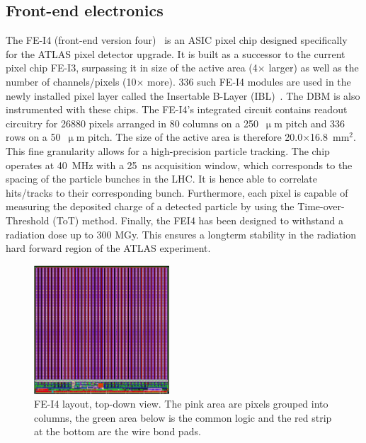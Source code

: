 \documentclass[twoside,12pt]{packages/mytustyle}  %
\begin{document}
\subsection{Front-end electronics}
The FE-I4 (front-end version four)~\cite{} is an ASIC pixel chip designed specifically for the ATLAS pixel detector upgrade. It is built as a successor to the current pixel chip FE-I3, surpassing it in size of the active area (4$\times$ larger) as well as the number of channels/pixels (10$\times$ more). 336 such FE-I4 modules are used in the newly installed pixel layer called the Insertable B-Layer (IBL)~\cite{}. The DBM is also instrumented with these chips. The FE-I4's integrated circuit contains readout circuitry for 26880 pixels arranged in 80 columns on a 250~$\upmu$m pitch and 336 rows on a 50~$\upmu$m pitch. The size of the active area is therefore 20.0$\times$16.8~mm$^2$. This fine granularity allows for a high-precision particle tracking. The chip operates at 40~MHz with a 25~ns acquisition window, which corresponds to the spacing of the particle bunches in the LHC. It is hence able to correlate hits/tracks to their corresponding bunch. Furthermore, each pixel is capable of measuring the deposited charge of a detected particle by using the Time-over-Threshold (ToT) method. Finally, the FEI4 has been designed to withstand a radiation dose up to 300 MGy. This ensures a longterm stability in the radiation hard forward region of the ATLAS experiment.

\begin{figure}[!t]
\centering
\includegraphics[width=0.45\textwidth]{pics/fei41}
\caption{FE-I4 layout, top-down view. The pink area are pixels grouped into columns, the green area below is the common logic and the red strip at the bottom are the wire bond pads.}
\label{fig:anapix}
\end{figure}
\end{document}
